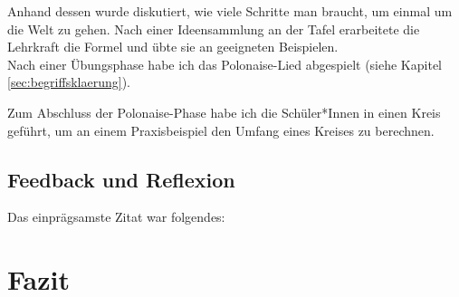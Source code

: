 \documentclass[a4paper, 12pt]{article}
\begin{document}
Anhand dessen wurde diskutiert, wie viele Schritte man braucht, um einmal um die Welt zu gehen. Nach einer Ideensammlung an der Tafel erarbeitete die Lehrkraft die Formel und übte sie an geeigneten Beispielen.\\
Nach einer Übungsphase habe ich das Polonaise-Lied abgespielt (siehe Kapitel \ref{sec:begriffsklaerung}).


Zum Abschluss der Polonaise-Phase habe ich die Schüler*Innen in einen Kreis geführt, um an einem Praxisbeispiel den Umfang eines Kreises zu berechnen.


\subsection{Feedback und Reflexion}


Das einprägsamste Zitat war folgendes:


\section{Fazit}


\newpage

\end{document}
